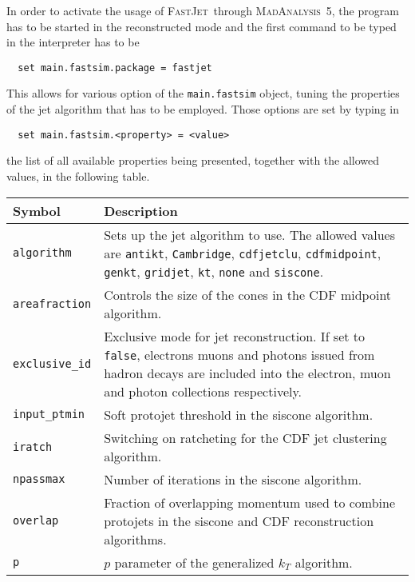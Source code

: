 \documentclass[a4paper]{article}
\newcommand{\MA}{\textsc{MadAnalysis}~5}
\newcommand{\FJ}{\textsc{FastJet}}
\begin{document}
\noindent In order to activate the usage of \FJ\ through \MA, the program has to be
started in the reconstructed mode and the first command to be typed in the
interpreter has to be
{\color{ao} \begin{verbatim}
  set main.fastsim.package = fastjet
\end{verbatim}}
\noindent This allows for various option of the \verb+main.fastsim+ object, tuning the
properties of the jet algorithm that has to be employed. Those options are set
by typing in
{\color{ao} \begin{verbatim}
  set main.fastsim.<property> = <value>
\end{verbatim}}
\noindent the list of all available properties being presented, together with the allowed
values, in the following table.
\renewcommand{\arraystretch}{1.2}%
\begin{center}\begin{tabular}{l p{9.4cm}}
\hline
Symbol& Description\\
\hline
\color{ao} \verb?algorithm? & Sets up the jet algorithm to use. The allowed
  values are \verb?antikt?\cite{Cacciari:2008gp}, \verb?Cambridge?\cite{%
   Dokshitzer:1997in,Wobisch:1998wt}, \verb?cdfjetclu?\cite{Abe:1991ui},
   \verb?cdfmidpoint?\cite{Blazey:2000qt}, \verb?genkt?\cite{Cacciari:2011ma},
   \verb?gridjet?\cite{Cacciari:2011ma}, \verb?kt?\cite{Catani:1993hr,%
   Ellis:1993tq}, \verb?none? and \verb?siscone?\cite{Salam:2007xv}.\\
\color{ao} \verb?areafraction? & Controls the size of the cones in the CDF midpoint
  algorithm.\\
\color{ao} \verb?exclusive_id? & Exclusive mode for jet reconstruction. If set
  to \verb+false+, electrons muons and photons issued from hadron decays are
  included into the electron, muon and photon collections respectively.\\
\color{ao} \verb?input_ptmin? & Soft protojet threshold in the siscone
  algorithm.\\
\color{ao} \verb?iratch? & Switching on ratcheting for the CDF jet clustering algorithm.\\
\color{ao} \verb?npassmax? & Number of iterations in the siscone algorithm.\\
\color{ao} \verb?overlap? & Fraction of overlapping momentum used to combine
  protojets in the siscone and CDF reconstruction algorithms.\\
\color{ao} \verb?p? & $p$ parameter of the generalized $k_T$ algorithm.\\

\end{tabular}
\end{center}
\end{document}
